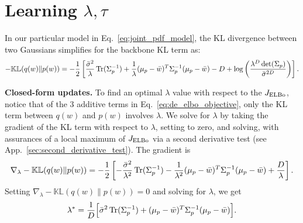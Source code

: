 \section{Learning $\lambda, \tau$}
\label{sec:learning_lambda_tau}

In our particular model in Eq.~\eqref{eq:joint_pdf_model}, the KL divergence between two Gaussians \citep{murphy2022Example} simplifies for the backbone KL term as:
\begin{align}
-\mathbb{KL}(q(w) \| p(w)) = -\frac{1}{2} \left[ \frac{\bar{\sigma}^2}{\lambda} \operatorname{Tr} (\Sigma_p^{-1}) + \frac{1}{\lambda} (\mu_p-\bar{w})^T\Sigma_p^{-1}(\mu_p-\bar{w}) - D + \log \left( \frac{\lambda^{D}\det(\Sigma_p)}{\bar{\sigma}^{2D}} \right) \right].
\end{align}

\textbf{Closed-form updates.} To find an optimal $\lambda$ value with respect to the $J_{\text{ELBo}}$, notice that of the 3 additive terms in Eq.~\eqref{eq:de_elbo_objective}, only the KL term between $q(w)$ and $p(w)$ involves $\lambda$. We solve for $\lambda$ by taking the gradient of the KL term with respect to $\lambda$, setting to zero, and solving, with assurances of a local maximum of $J_{\text{ELBo}}$ via a second derivative test (see App.~\ref{sec:second_derivative_test}). The gradient is
\begin{align}
    \nabla_\lambda -\mathbb{KL}(q(w) \| p(w)) = -\frac{1}{2} \left[ - \frac{\bar{\sigma}^2}{\lambda^2} \operatorname{Tr}(\Sigma_p^{-1}) - \frac{1}{\lambda^2} (\mu_p-\bar{w})^T \Sigma_p^{-1} (\mu_p-\bar{w}) + \frac{D}{\lambda} \right].
\end{align}
Setting $\nabla_\lambda -\mathbb{KL}(q(w) \| p(w)) = 0$ and solving for $\lambda$, we get 
\begin{align}
    \lambda^* = \frac{1}{D} \Big[ \bar{\sigma}^2 \operatorname{Tr}(\Sigma_p^{-1}) + (\mu_p-\bar{w})^T \Sigma_p^{-1} (\mu_p-\bar{w}) \Big].    
\end{align}


